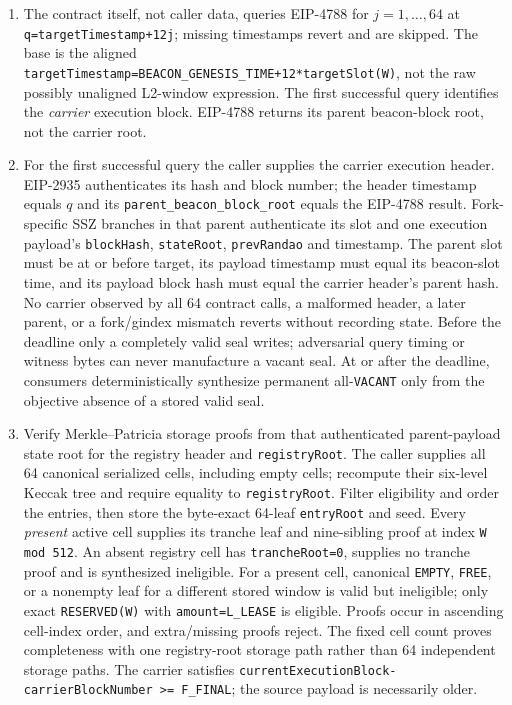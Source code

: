 \documentclass[a4paper,11pt]{article}
\newcommand{\code}[1]{\nolinkurl{#1}}
\begin{document}
\begin{enumerate}
\item The contract itself, not caller data, queries EIP-4788 for
$j=1,\ldots,64$ at
\code{q=targetTimestamp+12j}; missing timestamps revert and are skipped.  The
base is the aligned
\code{targetTimestamp=BEACON_GENESIS_TIME+12*targetSlot(W)}, not the raw
possibly unaligned L2-window expression.  The
first successful query identifies the \emph{carrier} execution block.  EIP-4788
returns its parent beacon-block root, not the carrier root.
\item For the first successful query the caller supplies the carrier execution
header.  EIP-2935 authenticates its hash and block number;
the header timestamp equals $q$ and its
\code{parent_beacon_block_root} equals the EIP-4788 result.  Fork-specific SSZ
branches in that parent authenticate its slot and one execution payload's
\code{blockHash}, \code{stateRoot}, \code{prevRandao} and timestamp.  The parent
slot must
be at or before target, its payload timestamp must equal its beacon-slot time,
and its payload block hash must equal the carrier header's parent hash.  No
carrier observed by all 64 contract calls, a malformed header, a later parent,
or a fork/gindex mismatch reverts without recording state.  Before the deadline
only a completely valid seal writes; adversarial query timing or witness bytes
can never manufacture a vacant seal.  At or after the deadline, consumers
deterministically synthesize permanent all-\code{VACANT} only from the
objective absence of a stored valid seal.
\item Verify Merkle--Patricia storage proofs from that authenticated parent-payload
state root for
the registry header and \code{registryRoot}.  The caller supplies all 64
canonical serialized cells, including empty cells; recompute their six-level
Keccak tree and require equality to \code{registryRoot}.  Filter eligibility and
order the entries, then store the byte-exact 64-leaf \code{entryRoot} and seed.
Every \emph{present} active cell supplies its tranche leaf and nine-sibling
proof at index \code{W mod 512}.  An absent registry cell has
\code{trancheRoot=0}, supplies no tranche proof and is synthesized ineligible.
For a present cell, canonical \code{EMPTY}, \code{FREE}, or a nonempty leaf for
a different stored window is valid but ineligible; only exact
\code{RESERVED(W)} with \code{amount=L_LEASE} is eligible.  Proofs occur in
ascending cell-index order, and extra/missing proofs reject.  The fixed cell
count proves completeness with one registry-root storage path rather than 64
independent storage paths.
The carrier satisfies
\code{currentExecutionBlock-carrierBlockNumber >= F_FINAL}; the source payload
is necessarily older.
\end{enumerate}
\end{document}
